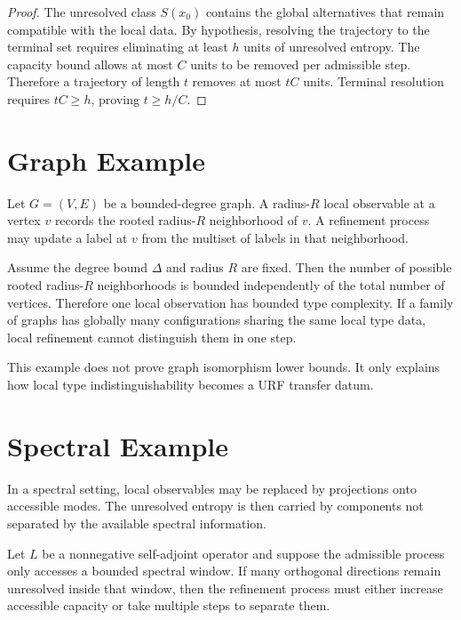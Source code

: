 \begin{proof}
The unresolved class \(S(x_0)\) contains the global alternatives that remain
compatible with the local data. By hypothesis, resolving the trajectory to the
terminal set requires eliminating at least \(h\) units of unresolved entropy.
The capacity bound allows at most \(C\) units to be removed per admissible
step. Therefore a trajectory of length \(t\) removes at most \(tC\) units.
Terminal resolution requires \(tC\ge h\), proving \(t\ge h/C\).
\end{proof}

\section{Graph Example}

Let \(G=(V,E)\) be a bounded-degree graph. A radius-\(R\) local observable at a
vertex \(v\) records the rooted radius-\(R\) neighborhood of \(v\). A refinement
process may update a label at \(v\) from the multiset of labels in that
neighborhood.

\begin{example}
Assume the degree bound \(\Delta\) and radius \(R\) are fixed. Then the number
of possible rooted radius-\(R\) neighborhoods is bounded independently of the
total number of vertices. Therefore one local observation has bounded type
complexity. If a family of graphs has globally many configurations sharing
the same local type data, local refinement cannot distinguish them in one
step.
\end{example}

This example does not prove graph isomorphism lower bounds. It only explains
how local type indistinguishability becomes a URF transfer datum.

\section{Spectral Example}

In a spectral setting, local observables may be replaced by projections onto
accessible modes. The unresolved entropy is then carried by components not
separated by the available spectral information.

\begin{example}
Let \(L\) be a nonnegative self-adjoint operator and suppose the admissible
process only accesses a bounded spectral window. If many orthogonal directions
remain unresolved inside that window, then the refinement process must either
increase accessible capacity or take multiple steps to separate them.
\end{example}

